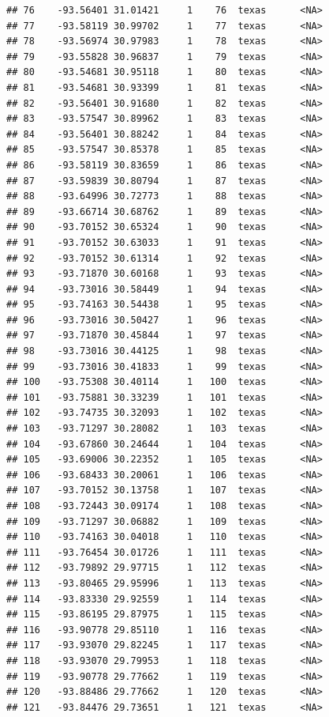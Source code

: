 \documentclass[
]{article}
\begin{document}
\begin{verbatim}
## 76    -93.56401 31.01421     1    76  texas      <NA>
## 77    -93.58119 30.99702     1    77  texas      <NA>
## 78    -93.56974 30.97983     1    78  texas      <NA>
## 79    -93.55828 30.96837     1    79  texas      <NA>
## 80    -93.54681 30.95118     1    80  texas      <NA>
## 81    -93.54681 30.93399     1    81  texas      <NA>
## 82    -93.56401 30.91680     1    82  texas      <NA>
## 83    -93.57547 30.89962     1    83  texas      <NA>
## 84    -93.56401 30.88242     1    84  texas      <NA>
## 85    -93.57547 30.85378     1    85  texas      <NA>
## 86    -93.58119 30.83659     1    86  texas      <NA>
## 87    -93.59839 30.80794     1    87  texas      <NA>
## 88    -93.64996 30.72773     1    88  texas      <NA>
## 89    -93.66714 30.68762     1    89  texas      <NA>
## 90    -93.70152 30.65324     1    90  texas      <NA>
## 91    -93.70152 30.63033     1    91  texas      <NA>
## 92    -93.70152 30.61314     1    92  texas      <NA>
## 93    -93.71870 30.60168     1    93  texas      <NA>
## 94    -93.73016 30.58449     1    94  texas      <NA>
## 95    -93.74163 30.54438     1    95  texas      <NA>
## 96    -93.73016 30.50427     1    96  texas      <NA>
## 97    -93.71870 30.45844     1    97  texas      <NA>
## 98    -93.73016 30.44125     1    98  texas      <NA>
## 99    -93.73016 30.41833     1    99  texas      <NA>
## 100   -93.75308 30.40114     1   100  texas      <NA>
## 101   -93.75881 30.33239     1   101  texas      <NA>
## 102   -93.74735 30.32093     1   102  texas      <NA>
## 103   -93.71297 30.28082     1   103  texas      <NA>
## 104   -93.67860 30.24644     1   104  texas      <NA>
## 105   -93.69006 30.22352     1   105  texas      <NA>
## 106   -93.68433 30.20061     1   106  texas      <NA>
## 107   -93.70152 30.13758     1   107  texas      <NA>
## 108   -93.72443 30.09174     1   108  texas      <NA>
## 109   -93.71297 30.06882     1   109  texas      <NA>
## 110   -93.74163 30.04018     1   110  texas      <NA>
## 111   -93.76454 30.01726     1   111  texas      <NA>
## 112   -93.79892 29.97715     1   112  texas      <NA>
## 113   -93.80465 29.95996     1   113  texas      <NA>
## 114   -93.83330 29.92559     1   114  texas      <NA>
## 115   -93.86195 29.87975     1   115  texas      <NA>
## 116   -93.90778 29.85110     1   116  texas      <NA>
## 117   -93.93070 29.82245     1   117  texas      <NA>
## 118   -93.93070 29.79953     1   118  texas      <NA>
## 119   -93.90778 29.77662     1   119  texas      <NA>
## 120   -93.88486 29.77662     1   120  texas      <NA>
## 121   -93.84476 29.73651     1   121  texas      <NA>

\end{verbatim}
\end{document}
